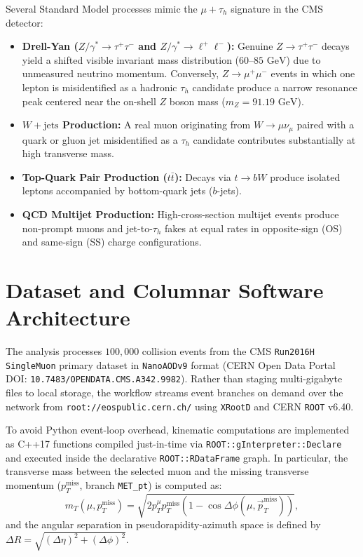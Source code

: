 \documentclass[11pt,a4paper]{article}
\begin{document}
Several Standard Model processes mimic the $\mu + \tau_h$ signature in the CMS detector:
\begin{itemize}
    \item \textbf{Drell-Yan ($Z/\gamma^* \to \tau^+\tau^-$ and $Z/\gamma^* \to \ell^+\ell^-$):} Genuine $Z \to \tau^+\tau^-$ decays yield a shifted visible invariant mass distribution ($60\text{--}85\text{ GeV}$) due to unmeasured neutrino momentum. Conversely, $Z \to \mu^+\mu^-$ events in which one lepton is misidentified as a hadronic $\tau_h$ candidate produce a narrow resonance peak centered near the on-shell $Z$ boson mass ($m_Z = 91.19\text{ GeV}$).
    \item \textbf{$W+\text{jets}$ Production:} A real muon originating from $W \to \mu\nu_\mu$ paired with a quark or gluon jet misidentified as a $\tau_h$ candidate contributes substantially at high transverse mass.
    \item \textbf{Top-Quark Pair Production ($t\bar{t}$):} Decays via $t \to bW$ produce isolated leptons accompanied by bottom-quark jets ($b$-jets).
    \item \textbf{QCD Multijet Production:} High-cross-section multijet events produce non-prompt muons and jet-to-$\tau_h$ fakes at equal rates in opposite-sign (OS) and same-sign (SS) charge configurations.
\end{itemize}

\section{Dataset and Columnar Software Architecture}
The analysis processes $100,000$ collision events from the CMS \texttt{Run2016H SingleMuon} primary dataset in \texttt{NanoAODv9} format (CERN Open Data Portal DOI: \texttt{10.7483/OPENDATA.CMS.A342.9982}). Rather than staging multi-gigabyte files to local storage, the workflow streams event branches on demand over the network from \texttt{root://eospublic.cern.ch/} using \texttt{XRootD} and CERN \texttt{ROOT} v6.40.

To avoid Python event-loop overhead, kinematic computations are implemented as C++17 functions compiled just-in-time via \texttt{ROOT::gInterpreter::Declare} and executed inside the declarative \texttt{ROOT::RDataFrame} graph. In particular, the transverse mass between the selected muon and the missing transverse momentum ($p_T^{\text{miss}}$, branch \texttt{MET\_pt}) is computed as:
\begin{equation}
    m_T(\mu, p_T^{\text{miss}}) = \sqrt{2 p_T^\mu p_T^{\text{miss}} \left(1 - \cos\Delta\phi(\mu, \vec{p}_T^{\text{miss}})\right)},
\end{equation}
and the angular separation in pseudorapidity-azimuth space is defined by $\Delta R = \sqrt{(\Delta\eta)^2 + (\Delta\phi)^2}$.
\end{document}
